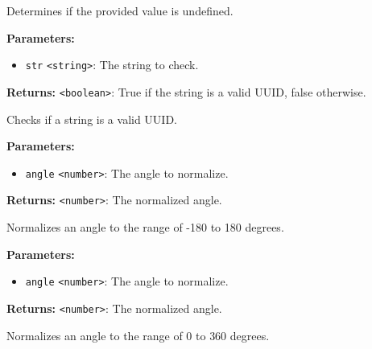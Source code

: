 \documentclass[12pt,a4paper]{article}
\begin{document}
\noindent Determines if the provided value is undefined.

\vspace{5mm}
\noindent {}


\noindent \textbf{Parameters:}
\begin{itemize}
  \item \texttt{str} \texttt{<string>}: The string to check.
\end{itemize}

\noindent \textbf{Returns:} \texttt{<boolean>}: True if the string is a valid UUID, false otherwise.

\noindent Checks if a string is a valid UUID.

\vspace{5mm}
\noindent {}


\noindent \textbf{Parameters:}
\begin{itemize}
  \item \texttt{angle} \texttt{<number>}: The angle to normalize.
\end{itemize}

\noindent \textbf{Returns:} \texttt{<number>}: The normalized angle.

\noindent Normalizes an angle to the range of -180 to 180 degrees.

\vspace{5mm}
\noindent {}


\noindent \textbf{Parameters:}
\begin{itemize}
  \item \texttt{angle} \texttt{<number>}: The angle to normalize.
\end{itemize}

\noindent \textbf{Returns:} \texttt{<number>}: The normalized angle.

\noindent Normalizes an angle to the range of 0 to 360 degrees.

\vspace{5mm}
\noindent {}
\end{document}
